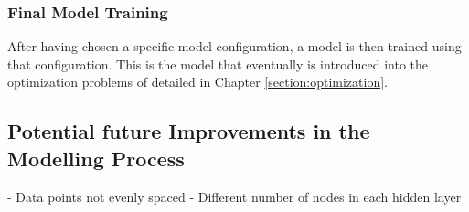 \subsubsection{Final Model Training}

After having chosen a specific model configuration, a model is then trained using that configuration. This is the model that eventually is introduced into the optimization problems of detailed in  Chapter \ref{section:optimization}.

\subsection{Potential future Improvements in the Modelling Process}

- Data points not evenly spaced 
- Different number of nodes in each hidden layer